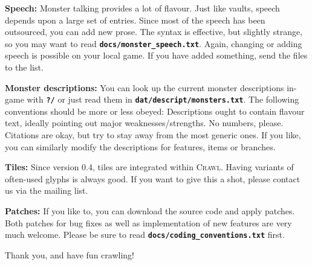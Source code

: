 \documentclass[a4paper,10pt]{article}
\newcommand{\key}[1]{{{\texttt{\textbf{#1}}}}} %
\newcommand{\crawl}{\textsc{Crawl}}
\newcommand{\para}{\vspace{1.5ex}}
\begin{document}
\para

\textbf{Speech:}
Monster talking provides a lot of flavour. Just like vaults, speech depends 
upon a large set of entries. Since most of the speech has been outsourced, 
you can add new prose. The syntax is effective, but slightly strange, so you 
may want to read \key{docs/monster\_speech.txt}.
Again, changing or adding speech is possible on your local game. If you 
have added something, send the files to the list.

\para

\textbf{Monster descriptions:}
You can look up the current monster descriptions in-game with \key{?/} or 
just read them in \key{dat/descript/monsters.txt}. The following conventions 
should be more or less obeyed: Descriptions ought to contain flavour text, 
ideally pointing out major weaknesses/strengths. No numbers, please. 
Citations are okay, but try to stay away from the most generic ones.
If you like, you can similarly modify the descriptions for features, items or
branches.

\para

\textbf{Tiles:}
Since version 0.4, tiles are integrated within \crawl. Having variants of 
often-used glyphs is always good. If you want to give this a shot, please 
contact us via the mailing list.

\para

\textbf{Patches:}
If you like to, you can download the source code and apply patches. Both 
patches for bug fixes as well as implementation of new features are very 
much welcome. Please be sure to read \key{docs/coding\_conventions.txt} first.

\para\para\para

Thank you, and have fun crawling!
\end{document}
